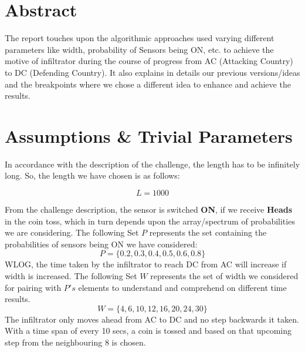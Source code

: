 \documentclass[12pt]{article}
\begin{document}
\maketitle


\section{Abstract}
The report touches upon the algorithmic approaches used varying different parameters like width, probability of Sensors being ON, etc. to achieve the motive of infiltrator during the course of progress from AC (Attacking Country) to DC (Defending Country).
It also explains in details our previous versions/ideas and the breakpoints where we chose a different idea to enhance and achieve the results.


\section{Assumptions \& Trivial Parameters}
In accordance with the description of the challenge, the length has to be infinitely long. So, the length we have chosen is as follows:

\begin{equation*}
    L = 1000
\end{equation*}

From the challenge description, the sensor is switched \textbf{ON}, if we receive \textbf{Heads} in the coin toss, which in turn depends upon the array/spectrum of probabilities we are considering.
The following Set $P$ represents the set containing the probabilities of sensors being ON we have considered:
\begin{equation*}
    P = \{0.2, 0.3, 0.4, 0.5, 0.6, 0.8\}
\end{equation*}
WLOG, the time taken by the infiltrator to reach DC from AC will increase if width is increased. The following Set $W$ represents the set of width we considered for pairing with $P's$ elements to understand and comprehend on different time results.
\begin{equation*}
    W = \{4, 6, 10, 12, 16, 20, 24, 30\}
\end{equation*}
The infiltrator only moves ahead from AC to DC and no step backwards it taken. With a time span of every 10 secs, a coin is tossed and based on that upcoming step from the neighbouring 8 is chosen.
\end{document}
